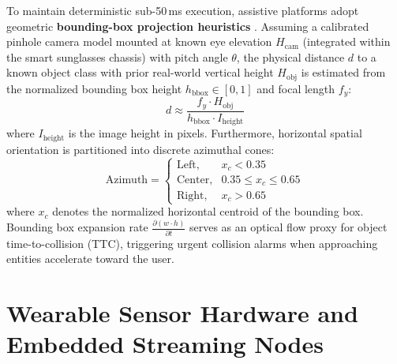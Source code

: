 \documentclass[10pt,twocolumn]{article}
\begin{document}
To maintain deterministic sub-50\,ms execution, assistive platforms adopt geometric \textbf{bounding-box projection heuristics} \cite{bhowmick2017vision}. Assuming a calibrated pinhole camera model mounted at known eye elevation $H_{\text{cam}}$ (integrated within the smart sunglasses chassis) with pitch angle $\theta$, the physical distance $d$ to a known object class with prior real-world vertical height $H_{\text{obj}}$ is estimated from the normalized bounding box height $h_{\text{bbox}} \in [0, 1]$ and focal length $f_y$:
\begin{equation}
    d \approx \frac{f_y \cdot H_{\text{obj}}}{h_{\text{bbox}} \cdot I_{\text{height}}}
\end{equation}
where $I_{\text{height}}$ is the image height in pixels. Furthermore, horizontal spatial orientation is partitioned into discrete azimuthal cones:
\begin{equation}
    \text{Azimuth} = 
    \begin{cases} 
        \text{Left}, & x_c < 0.35 \\
        \text{Center}, & 0.35 \le x_c \le 0.65 \\
        \text{Right}, & x_c > 0.65 
    \end{cases}
\end{equation}
where $x_c$ denotes the normalized horizontal centroid of the bounding box. Bounding box expansion rate $\frac{\partial (w \cdot h)}{\partial t}$ serves as an optical flow proxy for object time-to-collision (TTC), triggering urgent collision alarms when approaching entities accelerate toward the user.

\section{Wearable Sensor Hardware and Embedded Streaming Nodes}
\label{sec:hardware}
\end{document}
